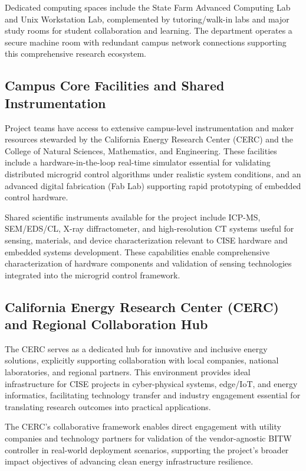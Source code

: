 \documentclass[12pt]{article}
\begin{document}
Dedicated computing spaces include the State Farm Advanced Computing Lab and Unix Workstation Lab, complemented by tutoring/walk-in labs and major study rooms for student collaboration and learning. The department operates a secure machine room with redundant campus network connections supporting this comprehensive research ecosystem.

\subsection{Campus Core Facilities and Shared Instrumentation}

Project teams have access to extensive campus-level instrumentation and maker resources stewarded by the California Energy Research Center (CERC) and the College of Natural Sciences, Mathematics, and Engineering. These facilities include a hardware-in-the-loop real-time simulator essential for validating distributed microgrid control algorithms under realistic system conditions, and an advanced digital fabrication (Fab Lab) supporting rapid prototyping of embedded control hardware.

Shared scientific instruments available for the project include ICP-MS, SEM/EDS/CL, X-ray diffractometer, and high-resolution CT systems useful for sensing, materials, and device characterization relevant to CISE hardware and embedded systems development. These capabilities enable comprehensive characterization of hardware components and validation of sensing technologies integrated into the microgrid control framework.

\subsection{California Energy Research Center (CERC) and Regional Collaboration Hub}

The CERC serves as a dedicated hub for innovative and inclusive energy solutions, explicitly supporting collaboration with local companies, national laboratories, and regional partners. This environment provides ideal infrastructure for CISE projects in cyber-physical systems, edge/IoT, and energy informatics, facilitating technology transfer and industry engagement essential for translating research outcomes into practical applications.

The CERC's collaborative framework enables direct engagement with utility companies and technology partners for validation of the vendor-agnostic BITW controller in real-world deployment scenarios, supporting the project's broader impact objectives of advancing clean energy infrastructure resilience.
\end{document}
